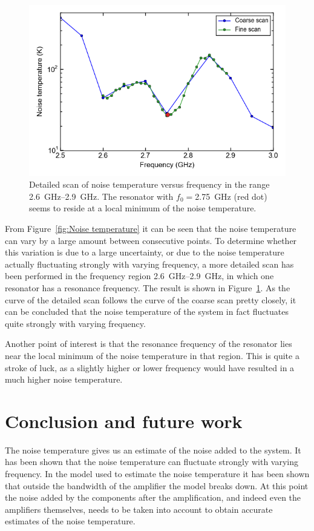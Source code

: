 \documentclass[12pt]{report}
\begin{document}
\begin{figure}[h]
    \centering
    \includegraphics[width = .6\linewidth]{Figures/noise_temperature_versus_power_detailed.png}
    \caption{Detailed scan of noise temperature versus frequency in the range \SIrange{2.6}{2.9}{\giga \hertz}. The resonator with $f_0 = $\SI{2.75}{\giga \hertz} (red dot) seems to reside at a local minimum of the noise temperature.}
    \label{fig:noise temperature 2GHz}
\end{figure}

From Figure~\ref{fig:Noise temperature} it can be seen that the noise temperature can vary by a large amount between consecutive points. To determine whether this variation is due to a large uncertainty, or due to the noise temperature actually fluctuating strongly with varying frequency, a more detailed scan has been performed in the frequency region \SIrange{2.6}{2.9}{\giga \hertz}, in which one resonator has a resonance frequency. The result is shown in Figure~\ref{fig:noise temperature 2GHz}. As the curve of the detailed scan follows the curve of the coarse scan pretty closely, it can be concluded that the noise temperature of the system in fact fluctuates quite strongly with varying frequency.

Another point of interest is that the resonance frequency of the resonator lies near the local minimum of the noise temperature in that region. This is quite a stroke of luck, as a slightly higher or lower frequency would have resulted in a much higher noise temperature.



\section{Conclusion and future work}

The noise temperature gives us an estimate of the noise added to the system. It has been shown that the noise temperature can fluctuate strongly with varying frequency. In the model used to estimate the noise temperature it has been shown that outside the bandwidth of the amplifier the model breaks down. At this point the noise added by the components after the amplification, and indeed even the amplifiers themselves, needs to be taken into account to obtain accurate estimates of the noise temperature.
\end{document}
